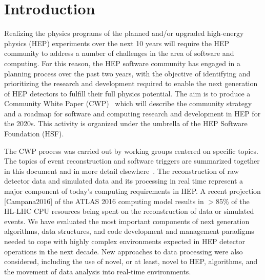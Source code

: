\section{Introduction}

Realizing the physics programs of the planned and/or upgraded high-energy physics (HEP) experiments over the next 10 years will require the HEP community to address a number of challenges in the area of software and computing. For this reason, the HEP software community has engaged in a planning process over the past two years, with the objective of identifying and prioritizing the research and development required to enable the next generation of HEP detectors to fulfill their full physics potential. The aim is to produce a Community White Paper (CWP)~\cite{HSF2017} which will describe the community strategy and a roadmap for software and computing research and development in HEP for the 2020s. This activity is organized under the umbrella of the HEP Software Foundation (HSF). 

The CWP process was carried out by working groups centered on specific topics. The topics of event reconstruction and software triggers are summarized together in this document and in more detail elsewhere~\cite{RECOCWP}. The reconstruction of raw detector data and simulated data and its processing in real time represent a major component of today's computing requirements in HEP. A recent projection [Campana2016] of the ATLAS 2016 computing model results in $>$85\% of the HL-LHC CPU resources being spent on the reconstruction of data or simulated events. We have evaluated the most important components of next generation algorithms, data structures, and code development and management paradigms needed to cope with highly complex environments expected in HEP detector operations in the next decade. New approaches to data processing were also considered, including the use of novel, or at least, novel to HEP, algorithms, and the movement of data analysis into real-time environments. 

